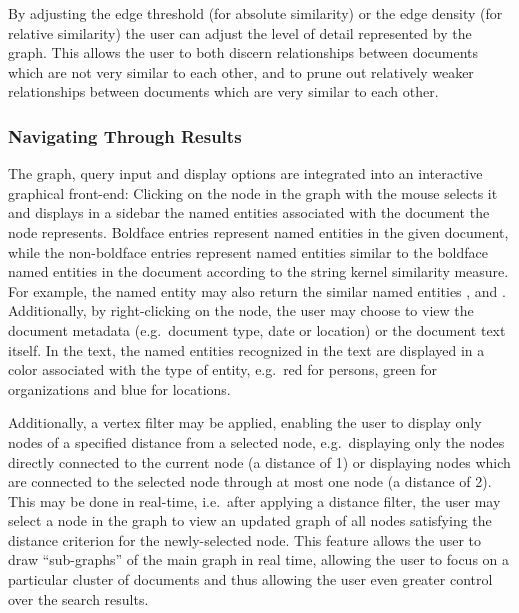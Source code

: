 By adjusting the edge threshold (for absolute similarity) or the edge density (for relative similarity) the user can adjust the level of detail represented by the graph. This allows the user to both discern relationships between documents which are not very similar to each other, and to prune out relatively weaker relationships between documents which are very similar to each other.

\pagebreak

\subsubsection {Navigating Through Results}
\label{sec:navigation_through_results}
The graph, query input and display options are integrated into an interactive graphical front-end: Clicking on the node in the graph with the mouse selects it and displays in a sidebar the named entities associated with the document the node represents. Boldface entries represent named entities in the given document, while the non-boldface entries represent named entities similar to the boldface named entities in the document according to the string kernel similarity measure. For example, the named entity \textbf{} may also return the similar named entities ,  and . Additionally, by right-clicking on the node, the user may choose to view the document metadata (e.g.\ document type, date or location) or the document text itself. In the text, the named entities recognized in the text are displayed in a color associated with the type of entity, e.g.\ red for persons, green for organizations and blue for locations.

Additionally, a vertex filter may be applied, enabling the user to display only nodes of a specified distance from a selected node, e.g.\ displaying only the nodes directly connected to the current node (a distance of 1) or displaying nodes which are connected to the selected node through at most one node (a distance of 2). This may be done in real-time, i.e.\ after applying a distance filter, the user may select a node in the graph to view an updated graph of all nodes satisfying the distance criterion for the newly-selected node. This feature allows the user to draw ``sub-graphs'' of the main graph in real time, allowing the user to focus on a particular cluster of documents and thus allowing the user even greater control over the search results.